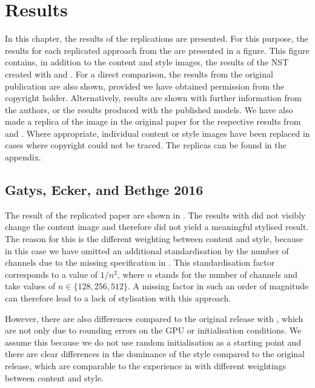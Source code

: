 \section{Results}
In this chapter, the results of the replications are presented. For this purpose, the results for each replicated approach from the  are presented in a figure. This figure contains, in addition to the content and style images, the results of the \gls{NST} created with \paper{} and \implementation{}. For a direct comparison, the results from the original publication are also shown, provided we have obtained permission from the copyright holder. Alternatively, results are shown with further information from the authors, or the results produced with the published models. We have also made a replica of the image in the original paper for the respective results from \paper{} and \implementation{}. Where appropriate, individual content or style images have been replaced in cases where copyright could not be traced. The replicas can be found in the appendix. 

\subsection{Gatys, Ecker, and Bethge 2016} \label{sec:Gatys1results}
The result of the replicated paper \cite{GEB2016} are shown in . The results with \paper{} did not visibly change the content image and therefore did not yield a meaningful stylised result. The reason for this is the different weighting between content and style, because in this case we have omitted an additional standardisation by the number of channels due to the missing specification in \paper{}. This standardisation factor corresponds to a value of $1/n^2$, where $n$ stands for the number of channels and take values of $n \in \{128, 256, 512\}$. A missing factor in such an order of magnitude can therefore lead to a lack of stylisation with this approach.

However, there are also differences compared to the original release with \implementation{}, which are not only due to rounding errors on the \gls{GPU} or initialisation conditions. We assume this because we do not use random initialisation as a starting point and there are clear differences in the dominance of the style compared to the original release, which are comparable to the experience in  with different weightings between content and style.

